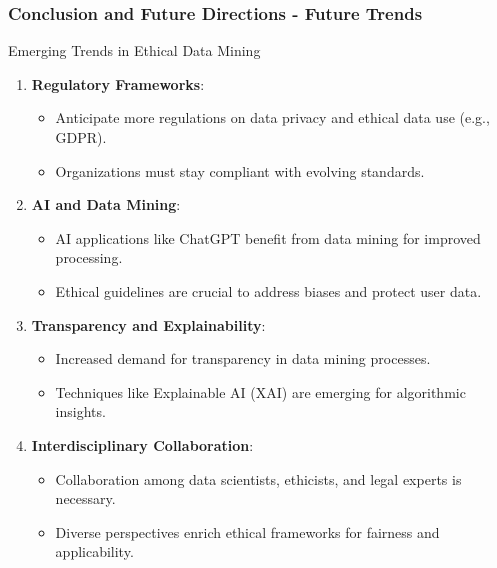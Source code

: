 \documentclass[aspectratio=169]{beamer}
\begin{document}
\begin{frame}[fragile]
    \frametitle{Conclusion and Future Directions - Future Trends}

    \begin{block}{Emerging Trends in Ethical Data Mining}
    \begin{enumerate}
        \item \textbf{Regulatory Frameworks}:
        \begin{itemize}
            \item Anticipate more regulations on data privacy and ethical data use (e.g., GDPR).
            \item Organizations must stay compliant with evolving standards.
        \end{itemize}
        
        \item \textbf{AI and Data Mining}:
        \begin{itemize}
            \item AI applications like ChatGPT benefit from data mining for improved processing.
            \item Ethical guidelines are crucial to address biases and protect user data.
        \end{itemize}
        
        \item \textbf{Transparency and Explainability}:
        \begin{itemize}
            \item Increased demand for transparency in data mining processes.
            \item Techniques like Explainable AI (XAI) are emerging for algorithmic insights.
        \end{itemize}
        
        \item \textbf{Interdisciplinary Collaboration}:
        \begin{itemize}
            \item Collaboration among data scientists, ethicists, and legal experts is necessary.
            \item Diverse perspectives enrich ethical frameworks for fairness and applicability.
        \end{itemize}
    \end{enumerate}
    \end{block}
\end{frame}
\end{document}
